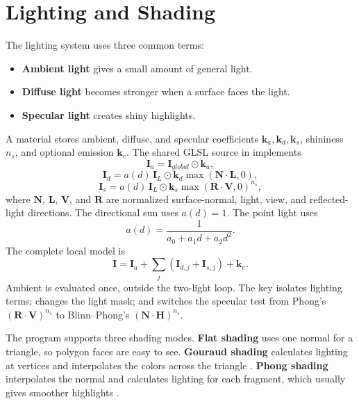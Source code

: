\documentclass[12pt,a4paper]{report}
\newcommand{\code}[1]{\texttt{\detokenize{#1}}}
\begin{document}
\section{Lighting and Shading}
The lighting system uses three common terms:
\begin{itemize}
    \item \textbf{Ambient light} gives a small amount of general light.
    \item \textbf{Diffuse light} becomes stronger when a surface faces the light.
    \item \textbf{Specular light} creates shiny highlights.
\end{itemize}

A material stores ambient, diffuse, and specular coefficients \(\mathbf{k}_a,\mathbf{k}_d,\mathbf{k}_s\), shininess \(n_s\), and optional emission \(\mathbf{k}_e\). The shared GLSL source in \code{Lighting.h} implements
\begin{equation}
\mathbf{I}_a=\mathbf{I}_{global}\odot\mathbf{k}_a,
\end{equation}
\begin{equation}
\mathbf{I}_d=a(d)\,\mathbf{I}_{L}\odot\mathbf{k}_d
\max(\mathbf{N}\cdot\mathbf{L},0),
\end{equation}
\begin{equation}
\mathbf{I}_s=a(d)\,\mathbf{I}_{L}\odot\mathbf{k}_s
\max(\mathbf{R}\cdot\mathbf{V},0)^{n_s},
\end{equation}
where \(\mathbf{N}\), \(\mathbf{L}\), \(\mathbf{V}\), and \(\mathbf{R}\) are normalized surface-normal, light, view, and reflected-light directions. The directional sun uses \(a(d)=1\). The point light uses
\begin{equation}
a(d)=\frac{1}{a_0+a_1d+a_2d^2}.
\end{equation}
The complete local model is
\begin{equation}
\mathbf{I}=\mathbf{I}_a+\sum_{j}\left(\mathbf{I}_{d,j}+\mathbf{I}_{s,j}\right)+\mathbf{k}_e.
\end{equation}
Ambient is evaluated once, outside the two-light loop. The \code{K} key isolates lighting terms; \code{L} changes the light mask; and \code{B} switches the specular test from Phong's \((\mathbf{R}\cdot\mathbf{V})^{n_s}\) to Blinn--Phong's \((\mathbf{N}\cdot\mathbf{H})^{n_s}\).

The program supports three shading modes. \textbf{Flat shading} uses one normal for a triangle, so polygon faces are easy to see. \textbf{Gouraud shading} calculates lighting at vertices and interpolates the colors across the triangle \cite{gouraud}. \textbf{Phong shading} interpolates the normal and calculates lighting for each fragment, which usually gives smoother highlights \cite{phong}.
\end{document}
